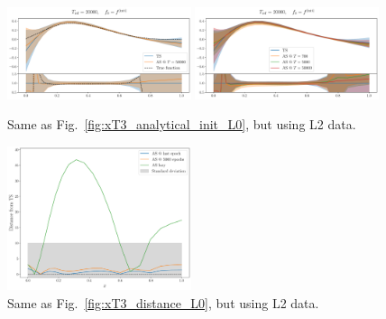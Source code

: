 \begin{figure}[ht!]
    \centering
    \includegraphics[width=0.48\textwidth]{plots/analytical_solution/pdf_plot_init_last_epoch_L2.pdf}
    \includegraphics[width=0.48\textwidth]{plots/analytical_solution/pdf_plot_init_epochs_L2.pdf}
    \caption{Same as Fig.~\ref{fig:xT3_analytical_init_L0}, but using L2 data.}
    \label{fig:xT3_analytical_init_L2}
  \end{figure}
  \begin{figure}[ht!]
    \centering
    \includegraphics[width=0.48\textwidth]{plots/analytical_solution/distance_plot_L2.pdf}
    \caption{Same as Fig.~\ref{fig:xT3_distance_L0}, but using L2 data.}
    \label{fig:xT3_distance_L2}
  \end{figure}


